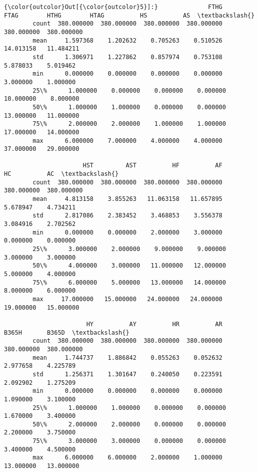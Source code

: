 \documentclass[11pt]{article}
\begin{document}
\begin{Verbatim}[commandchars=\\\{\}]
{\color{outcolor}Out[{\color{outcolor}5}]:}              FTHG        FTAG        HTHG        HTAG          HS          AS  \textbackslash{}
        count  380.000000  380.000000  380.000000  380.000000  380.000000  380.000000   
        mean     1.597368    1.202632    0.705263    0.510526   14.013158   11.484211   
        std      1.306971    1.227862    0.857974    0.753108    5.878033    5.019462   
        min      0.000000    0.000000    0.000000    0.000000    3.000000    1.000000   
        25\%      1.000000    0.000000    0.000000    0.000000   10.000000    8.000000   
        50\%      1.000000    1.000000    0.000000    0.000000   13.000000   11.000000   
        75\%      2.000000    2.000000    1.000000    1.000000   17.000000   14.000000   
        max      6.000000    7.000000    4.000000    4.000000   37.000000   29.000000   
        
                      HST         AST          HF          AF          HC          AC  \textbackslash{}
        count  380.000000  380.000000  380.000000  380.000000  380.000000  380.000000   
        mean     4.813158    3.855263   11.063158   11.657895    5.678947    4.734211   
        std      2.817086    2.383452    3.468853    3.556378    3.084916    2.702562   
        min      0.000000    0.000000    2.000000    3.000000    0.000000    0.000000   
        25\%      3.000000    2.000000    9.000000    9.000000    3.000000    3.000000   
        50\%      4.000000    3.000000   11.000000   12.000000    5.000000    4.000000   
        75\%      6.000000    5.000000   13.000000   14.000000    8.000000    6.000000   
        max     17.000000   15.000000   24.000000   24.000000   19.000000   15.000000   
        
                       HY          AY          HR          AR       B365H       B365D  \textbackslash{}
        count  380.000000  380.000000  380.000000  380.000000  380.000000  380.000000   
        mean     1.744737    1.886842    0.055263    0.052632    2.977658    4.225789   
        std      1.256371    1.301647    0.240050    0.223591    2.092902    1.275209   
        min      0.000000    0.000000    0.000000    0.000000    1.090000    3.100000   
        25\%      1.000000    1.000000    0.000000    0.000000    1.670000    3.400000   
        50\%      2.000000    2.000000    0.000000    0.000000    2.200000    3.750000   
        75\%      3.000000    3.000000    0.000000    0.000000    3.400000    4.500000   
        max      6.000000    6.000000    2.000000    1.000000   13.000000   13.000000   
        

\end{Verbatim}
\end{document}
